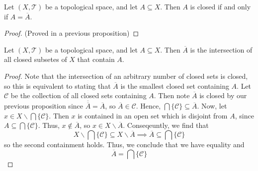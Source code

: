 \documentclass[12pt, a4paper, oneside, openright, titlepage]{book}
\begin{document}
\begin{proposition}
    Let $(X,\mathcal{T})$ be a topological space, and let $A \subseteq X$. Then $A$ is closed if and only if $A = \overline{A}$.
\end{proposition}
\begin{proof}
    (Proved in a previous proposition)
\end{proof}

\begin{proposition}
    Let $(X,\mathcal{T})$ be a topological space, and let $A\subseteq X$. Then $\overline{A}$ is the intersection of all closed subsetes of $X$ that contain $A$.
\end{proposition}
\begin{proof}
    Note that the intersection of an arbitrary number of closed sets is closed, so this is equivalent to stating that $\overline{A}$ is the smallest closed set containing $A$. Let $\mathcal{C}$ be the collection of all closed sets containing $A$. Then note $\overline{A}$ is closed by our previous proposition since $\overline{\overline{A}} = \overline{A}$, so $\overline{A} \in \mathcal{C}$. Hence, $\bigcap\{\mathcal{C}\}\subseteq \overline{A}$. Now, let $x \in X\backslash\bigcap\{\mathcal{C}\}$. Then $x$ is contained in an open set which is disjoint from $A$, since $A \subseteq \bigcap\{\mathcal{C}\}$. Thus, $x \notin \overline{A}$, so $x \in X\backslash \overline{A}$. Conseqeuntly, we find that \begin{equation*}
        X\backslash\bigcap\{\mathcal{C}\} \subseteq X\backslash \overline{A} \implies \overline{A} \subseteq \bigcap\{\mathcal{C}\}
    \end{equation*}
    so the second containment holds. Thus, we conclude that we have equality and \begin{equation*}
        \overline{A} = \bigcap\{\mathcal{C}\}
    \end{equation*}
\end{proof}
\end{document}
